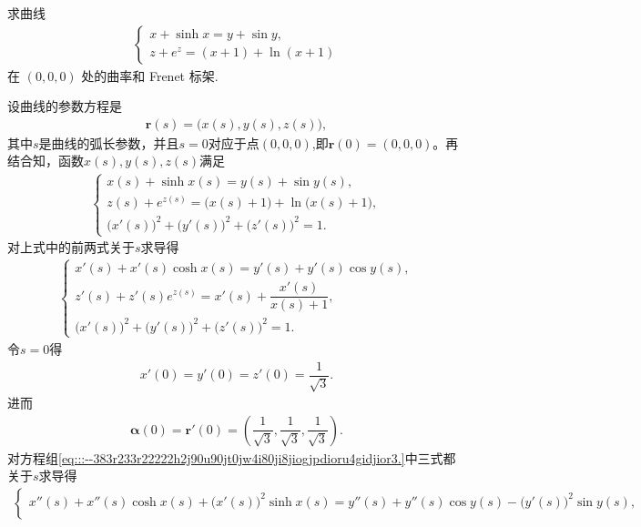 \documentclass[../../main.tex]{subfiles}%
\begin{document}
\begin{example}
求曲线
\begin{align*}
\begin{cases}
x + \sinh x = y + \sin y, \\
z + e^z = (x + 1) + \ln(x + 1)
\end{cases}
\end{align*}
在 $(0,0,0)$ 处的曲率和 Frenet 标架.
\end{example}
\begin{solution}

设曲线的参数方程是
\begin{align*}
\bm{r}(s) = \big(x(s), y(s), z(s)\big),
\end{align*}
其中$s$是曲线的弧长参数，并且$s=0$对应于点$(0,0,0)$,即$\bm{r}(0)=(0,0,0)$。再结合知，函数$x(s), y(s), z(s)$满足
\begin{align*}
\begin{cases}
x(s) + \sinh x(s) = y(s) + \sin y(s), \\
z(s) + e^{z(s)} = \big(x(s) + 1\big) + \ln\big(x(s) + 1\big), \\
\big(x'(s)\big)^2 + \big(y'(s)\big)^2 + \big(z'(s)\big)^2 = 1.
\end{cases}
\end{align*}
对上式中的前两式关于$s$求导得
\begin{align}
\begin{cases}
x'(s) + x'(s)\cosh x(s) = y'(s) + y'(s)\cos y(s), \\
z'(s) + z'(s)e^{z(s)} = x'(s) + \dfrac{x'(s)}{x(s) + 1}, \\
\big(x'(s)\big)^2 + \big(y'(s)\big)^2 + \big(z'(s)\big)^2 = 1.
\end{cases}
\label{eq:::--383r233r22222h2j90u90jt0jw4i80ji8jiogjpdioru4gidjior3.}
\end{align}
令$s=0$得
\begin{align*}
x'(0) = y'(0) = z'(0) = \dfrac{1}{\sqrt{3}}.
\end{align*}
进而
\begin{align*}
\bm{\alpha}(0) = \bm{r}'(0) = \left( \dfrac{1}{\sqrt{3}}, \dfrac{1}{\sqrt{3}}, \dfrac{1}{\sqrt{3}} \right).
\end{align*}
对方程组\eqref{eq:::--383r233r22222h2j90u90jt0jw4i80ji8jiogjpdioru4gidjior3.}中三式都关于$s$求导得
\begin{align*}
\begin{cases}
x''(s) + x''(s)\cosh x(s) + \big(x'(s)\big)^2\sinh x(s) = y''(s) + y''(s)\cos y(s) - \big(y'(s)\big)^2\sin y(s), \\

\end{cases}
\end{align*}
\end{solution}
\end{document}
